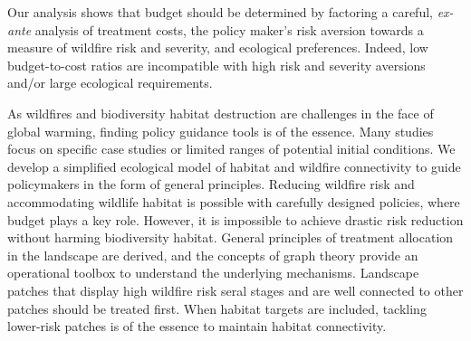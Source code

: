 Our analysis shows that budget should be determined by factoring a careful, \textit{ex-ante} analysis of treatment costs, the policy maker's risk aversion towards a measure of wildfire risk and severity, and ecological preferences.  Indeed, low budget-to-cost ratios are incompatible with high risk and severity aversions and/or large ecological requirements.

As wildfires and biodiversity habitat destruction are challenges in the face of global warming, finding policy guidance tools is of the essence. Many studies focus on specific case studies or limited ranges of potential initial conditions. We develop a simplified ecological model of habitat and wildfire connectivity to guide policymakers in the form of general principles. Reducing wildfire risk and accommodating wildlife habitat is possible with carefully designed policies, where budget plays a key role. However, it is impossible to achieve drastic risk reduction without harming biodiversity habitat. General principles of treatment allocation in the landscape are derived, and the concepts of graph theory provide an operational toolbox to understand the underlying mechanisms. Landscape patches that display high wildfire risk seral stages and are well connected to other patches should be treated first. When habitat targets are included, tackling lower-risk patches is of the essence to maintain habitat connectivity. 


